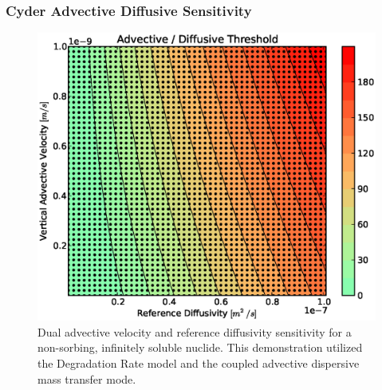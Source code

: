 \begin{frame}[ctb!]
\frametitle{Cyder Advective Diffusive Sensitivity}
\begin{figure}[ht]
\centering
\includegraphics[height=0.7\textheight]{./nuclide_demonstration/adv_vel_diff.eps}
\caption[Advection vs. Diffusion Sensitivity in Cyder]{Dual advective velocity 
and reference diffusivity sensitivity for a non-sorbing, infinitely soluble 
nuclide. This demonstration utilized the Degradation Rate model and the coupled 
advective dispersive mass transfer mode.}
\label{fig:dr_adv_diff}
\end{figure}
\end{frame}

